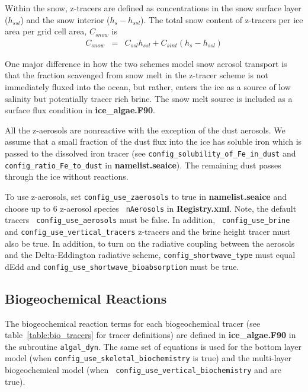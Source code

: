 Within the snow,  z-tracers are defined as concentrations in the snow
surface layer ($h_{ssl}$) and the snow interior ($h_s-h_{ssl}$).  The
total snow content of z-tracers per ice area per grid cell area, $C_{snow}$  is
\begin{eqnarray}
C_{snow} & = & C_{ssl}h_{ssl} + C_{sint}(h_{s}-h_{ssl})
\end{eqnarray}

One major difference in how the two schemes model snow aerosol transport is
that the fraction scavenged from snow melt in the z-tracer scheme is not immediately fluxed
into the ocean, but rather, enters the ice as a source of low
salinity but potentially tracer rich brine.  The snow melt source is
included as a surface flux condition in {\bf ice\_algae.F90}.

All the z-aerosols are nonreactive with the exception of the
dust aerosols. We assume that a small fraction of the dust flux into
the ice has soluble iron  which is passed to the dissolved iron
tracer (see {\tt config\_solubility\_of\_Fe\_in\_dust} and {\tt
  config\_ratio\_Fe\_to\_dust} in {\bf namelist.seaice}).  The remaining dust passes through the ice without reactions.

To use z-aerosols, set {\tt config\_use\_zaerosols}  to true in {\bf
 namelist.seaice} and choose up to 6  z-aerosol species {\tt
  nAerosols} in  {\bf
  Registry.xml}.    Note, the default tracers {\tt
  config\_use\_aerosols} must be false. In addition, {\tt
  config\_use\_brine} and {\tt config\_use\_vertical\_tracers} z-tracers and the brine height tracer  must also be
true.   In addition, to turn on the radiative
coupling between the aerosols and the Delta-Eddington radiative
scheme, {\tt config\_shortwave\_type} must equal dEdd and {\tt config\_use\_shortwave\_bioabsorption} must
be true.

\subsection{Biogeochemical Reactions}
\label{sec:reactions}
The biogeochemical reaction terms for each biogeochemical tracer (see
table~\ref{table:bio_tracers} for tracer definitions) are defined in {\bf ice\_algae.F90}
in the subroutine {\tt algal\_dyn}. The same set of equations is used
for the bottom layer  model (when {\tt config\_use\_skeletal\_biochemistry} is true) and the
multi-layer biogeochemical model (when {\tt
  config\_use\_vertical\_biochemistry} and  are true).


